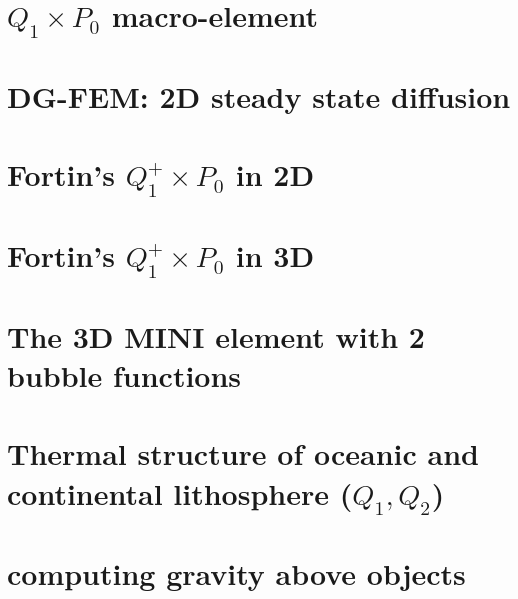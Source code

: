 \documentclass[a4paper,11pt]{report}
\begin{document}
\chapter{$Q_1\times P_0$ macro-element \label{f78}} %

\chapter{DG-FEM: 2D steady state diffusion \label{f79}} %

\chapter{Fortin's $Q_1^+\times P_0$ in 2D \label{f80}} %

\chapter{Fortin's $Q_1^+\times P_0$ in 3D \label{f81}} %

\chapter{The 3D MINI element with 2 bubble functions \label{f82}} %

\chapter{Thermal structure of oceanic and continental lithosphere ($Q_1,Q_2$)\label{f83}} %

\chapter{computing gravity above objects \label{f84}} %
\end{document}
